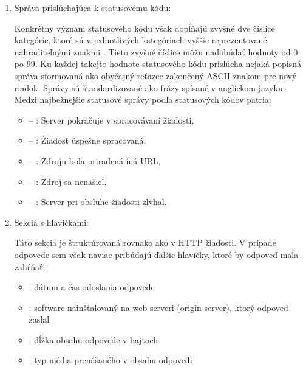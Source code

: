 \begin{enumerate}
\begin{enumerate}
    \end{enumerate}

    \item Správa prislúchajúca k statusovému kódu:

    Konkrétny význam statusového kódu však dopĺňajú zvyšné dve číslice kategórie, ktoré sú v jednotlivých kategóriach vyššie reprezentované nahraditeľnými znakmi .
    Tieto zvyšné číslice môžu nadobúdať hodnoty od 0 po 99.
    Ku každej takejto hodnote statusového kódu prislúcha nejaká popisná správa sformovaná ako obyčajný reťazec zakončený ASCII znakom pre nový riadok. 
    Správy sú štandardizované ako frázy spísané v anglickom jazyku.
    Medzi najbežnejšie statusové správy podľa statusových kódov patria:

    \begin{itemize}
        \item {} -- : Server pokračuje v spracovávaní žiadosti,
        \item {} -- : Žiadosť úspešne spracovaná,
        \item {} -- : Zdroju bola priradená iná URL,
        \item {} -- : Zdroj sa nenašiel,
        \item {} -- : Server pri obsluhe žiadosti zlyhal.
    \end{itemize}

    \pagebreak

    \item Sekcia s hlavičkami:

    Táto sekcia je štruktúrovaná rovnako ako v HTTP žiadosti. V prípade odpovede sem však naviac pribúdajú ďalšie hlavičky, ktoré by odpoveď mala zahŕňať: 

    \begin{itemize}
        \item {}: dátum a čas odoslania odpovede
        \item {}: software nainštalovaný na web serveri (origin server), ktorý odpoveď zaslal
        \item {}: dĺžka obsahu odpovede v bajtoch
        \item {}: typ média prenášaného v obsahu odpovedi


\end{itemize}
\end{enumerate}
